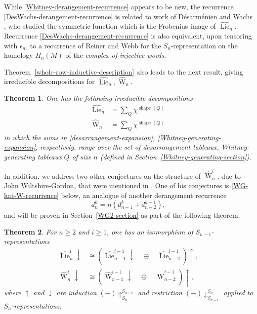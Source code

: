 \documentclass[12pt]{amsart}
\theoremstyle{plain}
\newtheorem{thm}{Theorem}[section]
\theoremstyle{definition}
\begin{document}
\noindent
While \eqref{Whitney-derangement-recurrence} appears to be new, 
the recurrence \eqref{DesWachs-derangement-recurrence} 
is related to work of D\'esarm\'enien and Wachs \cite{DesarmenienWachs},
who studied the symmetric function which is the Frobenius image of 
$\widehat{{\operatorname{Lie}}}_n$.  Recurrence  \eqref{DesWachs-derangement-recurrence} 
is also equivalent, upon tensoring with $\epsilon_n$, to a recurrence of
Reiner and Webb \cite[Prop. 2.2]{WebbR} for the $S_n$-representation on the homology $H_n(M)$ 
of the {\it complex of injective words}. 

Theorem~\ref{whole-row-inductive-description} also leads to the next result, 
giving irreducible decompositions for 
$\widehat{{\operatorname{Lie}}}_n, \widehat{{\operatorname{W}}}_n$.

\begin{thm}
\label{Whitney-generating-tableaux-theorem}
One has the following irreducible decompositions 
\begin{align}
\label{desarrangement-expansion}
\widehat{{\operatorname{Lie}}}_n&=\sum_Q \chi^{{{\operatorname{shape}}}(Q)} \\
\label{Whitney-generating-expansion}
\widehat{{\operatorname{W}}}_n&=\sum_Q \chi^{{{\operatorname{shape}}}(Q)}
\end{align}
in which the sums in \eqref{desarrangement-expansion}, 
\eqref{Whitney-generating-expansion}, respectively, range over
the set of desarrangement tableaux, Whitney-generating tableaux  
$Q$ of size $n$ (defined in Section~\ref{Whitney-generating-section}).
\end{thm}

In addition, we address two other conjectures on the structure of
$\widehat{{\operatorname{W}}}_n^i$, due to John Wiltshire-Gordon, that were mentioned in
\cite[\S 3.1, p. 37]{CEF}.
One of his conjectures is \eqref{WG-hat-W-recurrence} below, an analogue of another 
derangement recurrence
$$
d_n^k = n(d_{n-1}^{k} + d_{n-2}^{k-1}),
$$
and will be proven in Section~\ref{WG2-section} as part of the following theorem.

\begin{thm}
\label{Wiltshire-Gordon-Conjecture2}
For $n \geq 2$ and $i \geq 1$, one has an 
isomorphism of $S_{n-1}$-representations
\begin{align}
\label{WG-like-hat-Lie-recurrence}
\widehat{{\operatorname{Lie}}}^{i}_{n} \downarrow
&\cong
\left( \widehat{{\operatorname{Lie}}}^{i-1}_{n-1} \downarrow 
\quad \oplus \quad 
\widehat{{\operatorname{Lie}}}^{i-1}_{n-2} \right) \uparrow,\\
\label{WG-hat-W-recurrence}
\widehat{{\operatorname{W}}}^{i}_{n} \downarrow
&\cong
\left( \widehat{{\operatorname{W}}}^{i-1}_{n-1} \downarrow 
\quad \oplus \quad 
\widehat{{\operatorname{W}}}^{i-1}_{n-2} \right) \uparrow,
\end{align}
where 
$\uparrow$ and $\downarrow$ are
induction $(-)\uparrow_{S_n}^{S_{n+1}}$ and 
restriction $(-)\downarrow_{S_{n-1}}^{S_{n}}$ 
applied to $S_n$-representations.
\end{thm}
\end{document}

